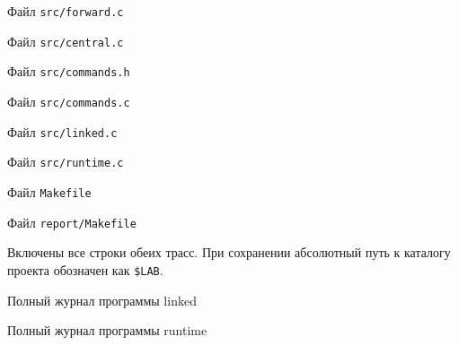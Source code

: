 \documentclass[12pt,a4paper]{article}
\begin{document}
\begin{listingblock}{Файл \texttt{src/forward.c}}
\end{listingblock}

\begin{listingblock}{Файл \texttt{src/central.c}}
\end{listingblock}

\begin{listingblock}{Файл \texttt{src/commands.h}}
\end{listingblock}

\begin{listingblock}{Файл \texttt{src/commands.c}}
\end{listingblock}

\begin{listingblock}{Файл \texttt{src/linked.c}}
\end{listingblock}

\begin{listingblock}{Файл \texttt{src/runtime.c}}
\end{listingblock}

\begin{listingblock}{Файл \texttt{Makefile}}
\end{listingblock}

\begin{listingblock}{Файл \texttt{report/Makefile}}
\end{listingblock}

Включены все строки обеих трасс. При сохранении абсолютный путь к каталогу проекта обозначен как \texttt{\$LAB}.

\begin{listingblock}{Полный журнал программы linked}
\end{listingblock}

\begin{listingblock}{Полный журнал программы runtime}
\end{listingblock}
\end{document}
